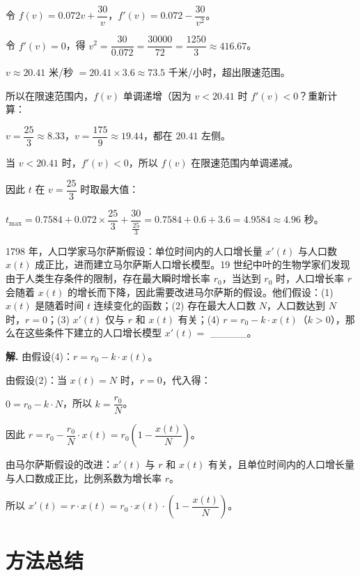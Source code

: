 \documentclass[11pt]{ctexrep}
\begin{document}
令 $f(v) = 0.072v + \dfrac{30}{v}$，$f'(v) = 0.072 - \dfrac{30}{v^2}$。

令 $f'(v) = 0$，得 $v^2 = \dfrac{30}{0.072} = \dfrac{30000}{72} = \dfrac{1250}{3} \approx 416.67$。

$v \approx 20.41$ 米/秒 $= 20.41 \times 3.6 \approx 73.5$ 千米/小时，超出限速范围。

所以在限速范围内，$f(v)$ 单调递增（因为 $v < 20.41$ 时 $f'(v) < 0$？重新计算：

$v = \dfrac{25}{3} \approx 8.33$，$v = \dfrac{175}{9} \approx 19.44$，都在 $20.41$ 左侧。

当 $v < 20.41$ 时，$f'(v) < 0$，所以 $f(v)$ 在限速范围内单调递减。

因此 $t$ 在 $v = \dfrac{25}{3}$ 时取最大值：

$t_{\max} = 0.7584 + 0.072 \times \dfrac{25}{3} + \dfrac{30}{\frac{25}{3}} = 0.7584 + 0.6 + 3.6 = 4.9584 \approx 4.96$ 秒。

\begin{realexam}[2025 虹口二模]
    1798 年，人口学家马尔萨斯假设：单位时间内的人口增长量 $x'(t)$ 与人口数 $x(t)$ 成正比，进而建立马尔萨斯人口增长模型。19 世纪中叶的生物学家们发现由于人类生存条件的限制，存在最大瞬时增长率 $r_0$，当达到 $r_0$ 时，人口增长率 $r$ 会随着 $x(t)$ 的增长而下降，因此需要改进马尔萨斯的假设。他们假设：(1) $x(t)$ 是随着时间 $t$ 连续变化的函数；(2) 存在最大人口数 $N$，人口数达到 $N$ 时，$r = 0$；(3) $x'(t)$ 仅与 $r$ 和 $x(t)$ 有关；(4) $r = r_0 - k \cdot x(t)$（$k > 0$），那么在这些条件下建立的人口增长模型 $x'(t) =$ \_\_\_\_\_。
\end{realexam}

\textbf{解.} 由假设(4)：$r = r_0 - k \cdot x(t)$。

由假设(2)：当 $x(t) = N$ 时，$r = 0$，代入得：

$0 = r_0 - k \cdot N$，所以 $k = \dfrac{r_0}{N}$。

因此 $r = r_0 - \dfrac{r_0}{N} \cdot x(t) = r_0\left(1 - \dfrac{x(t)}{N}\right)$。

由马尔萨斯假设的改进：$x'(t)$ 与 $r$ 和 $x(t)$ 有关，且单位时间内的人口增长量与人口数成正比，比例系数为增长率 $r$。

所以 $x'(t) = r \cdot x(t) = r_0 \cdot x(t) \cdot \left(1 - \dfrac{x(t)}{N}\right)$。

\section*{方法总结}
\end{document}
